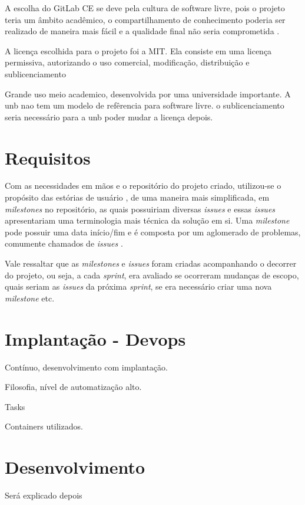A escolha do GitLab CE se deve pela cultura de software livre, pois o projeto teria um âmbito acadêmico, o compartilhamento de conhecimento poderia ser realizado de maneira mais fácil e a qualidade final não seria comprometida \cite{raymond1999}.

A licença escolhida para o projeto foi a MIT. Ela consiste em uma licença permissiva, autorizando o uso comercial, modificação, distribuição e sublicenciamento \cite{mit_license}

Grande uso meio academico, desenvolvida por uma universidade importante. A unb nao tem um modelo de refêrencia para software livre. o sublicenciamento seria necessário para a unb poder mudar a licença depois.

\section{Requisitos}
Com as necessidades em mãos e o repositório do projeto criado, utilizou-se o propósito das estórias de usuário \cite{beck_2004}, de uma maneira mais simplificada, em \textit{milestones} no repositório, as quais possuiriam diversas \textit{issues} e essas \textit{issues} apresentariam uma terminologia mais técnica da solução em si. Uma \textit{milestone} pode possuir uma data início/fim e é composta por um aglomerado de problemas, comumente chamados de \textit{issues} \cite{gitlab}.

Vale ressaltar que as \textit{milestones} e \textit{issues} foram criadas acompanhando o decorrer do projeto, ou seja, a cada \textit{sprint}, era avaliado se ocorreram mudanças de escopo, quais seriam as \textit{issues} da próxima \textit{sprint}, se era necessário criar uma nova \textit{milestone} etc.

\section{Implantação - Devops}
Contínuo, desenvolvimento com implantação.

Filosofia, nível de automatização alto.

Tasks

Containers utilizados.

\section{Desenvolvimento}
Será explicado depois